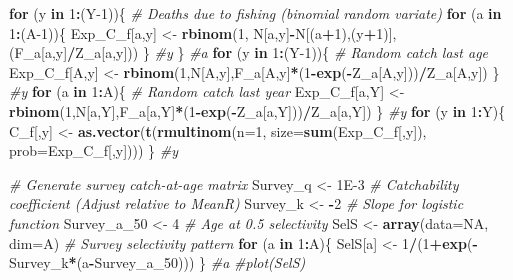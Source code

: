 \documentclass[
]{krantz}
\makeatletter
\newenvironment{Shaded}{\begin{snugshade}}{\end{snugshade}}
\newcommand{\AttributeTok}[1]{\textcolor[rgb]{0.27,0.27,0.27}{#1}}
\newcommand{\CommentTok}[1]{\textcolor[rgb]{0.37,0.37,0.37}{\textit{#1}}}
\newcommand{\ConstantTok}[1]{\textcolor[rgb]{0.37,0.37,0.37}{#1}}
\newcommand{\ControlFlowTok}[1]{\textcolor[rgb]{0.27,0.27,0.27}{\textbf{#1}}}
\newcommand{\DecValTok}[1]{\textcolor[rgb]{0.06,0.06,0.06}{#1}}
\newcommand{\FloatTok}[1]{\textcolor[rgb]{0.06,0.06,0.06}{#1}}
\newcommand{\FunctionTok}[1]{\textcolor[rgb]{0.27,0.27,0.27}{\textbf{#1}}}
\newcommand{\NormalTok}[1]{#1}
\newcommand{\OtherTok}[1]{\textcolor[rgb]{0.37,0.37,0.37}{#1}}
\newcommand{\SpecialCharTok}[1]{\textcolor[rgb]{0.43,0.43,0.43}{\textbf{#1}}}
\newenvironment{kframe}{%
\medskip{}
\setlength{\fboxsep}{.8em}
 \def\at@end@of@kframe{}%
 \ifinner\ifhmode%
  \def\at@end@of@kframe{\end{minipage}}%
  \begin{minipage}{\columnwidth}%
 \fi\fi%
 \def\FrameCommand##1{\hskip\@totalleftmargin \hskip-\fboxsep
 \colorbox{shadecolor}{##1}\hskip-\fboxsep
     \hskip-\linewidth \hskip-\@totalleftmargin \hskip\columnwidth}%
 \MakeFramed {\advance\hsize-\width
   \@totalleftmargin\z@ \linewidth\hsize
   \@setminipage}}%
 {\par\unskip\endMakeFramed%
 \at@end@of@kframe}
\renewenvironment{Shaded}{\begin{kframe}}{\end{kframe}}
\makeatother
\begin{document}
\begin{Shaded}
\begin{Highlighting}[]
\ControlFlowTok{for}\NormalTok{ (y }\ControlFlowTok{in} \DecValTok{1}\SpecialCharTok{:}\NormalTok{(Y}\DecValTok{{-}1}\NormalTok{))\{ }\CommentTok{\# Deaths due to fishing (binomial random variate)}
  \ControlFlowTok{for}\NormalTok{ (a }\ControlFlowTok{in} \DecValTok{1}\SpecialCharTok{:}\NormalTok{(A}\DecValTok{{-}1}\NormalTok{))\{}
\NormalTok{    Exp\_C\_f[a,y] }\OtherTok{\textless{}{-}} \FunctionTok{rbinom}\NormalTok{(}\DecValTok{1}\NormalTok{, N[a,y]}\SpecialCharTok{{-}}\NormalTok{N[(a}\SpecialCharTok{+}\DecValTok{1}\NormalTok{),(y}\SpecialCharTok{+}\DecValTok{1}\NormalTok{)],(F\_a[a,y]}\SpecialCharTok{/}\NormalTok{Z\_a[a,y]))}
\NormalTok{  \} }\CommentTok{\#y}
\NormalTok{\} }\CommentTok{\#a}
\ControlFlowTok{for}\NormalTok{ (y }\ControlFlowTok{in} \DecValTok{1}\SpecialCharTok{:}\NormalTok{(Y}\DecValTok{{-}1}\NormalTok{))\{ }\CommentTok{\# Random catch last age}
\NormalTok{  Exp\_C\_f[A,y] }\OtherTok{\textless{}{-}} \FunctionTok{rbinom}\NormalTok{(}\DecValTok{1}\NormalTok{,N[A,y],F\_a[A,y]}\SpecialCharTok{*}\NormalTok{(}\DecValTok{1}\SpecialCharTok{{-}}\FunctionTok{exp}\NormalTok{(}\SpecialCharTok{{-}}\NormalTok{Z\_a[A,y]))}\SpecialCharTok{/}\NormalTok{Z\_a[A,y])}
\NormalTok{\} }\CommentTok{\#y}
\ControlFlowTok{for}\NormalTok{ (a }\ControlFlowTok{in} \DecValTok{1}\SpecialCharTok{:}\NormalTok{A)\{ }\CommentTok{\# Random catch last year}
\NormalTok{  Exp\_C\_f[a,Y] }\OtherTok{\textless{}{-}} \FunctionTok{rbinom}\NormalTok{(}\DecValTok{1}\NormalTok{,N[a,Y],F\_a[a,Y]}\SpecialCharTok{*}\NormalTok{(}\DecValTok{1}\SpecialCharTok{{-}}\FunctionTok{exp}\NormalTok{(}\SpecialCharTok{{-}}\NormalTok{Z\_a[a,Y]))}\SpecialCharTok{/}\NormalTok{Z\_a[a,Y])}
\NormalTok{\} }\CommentTok{\#y}
\ControlFlowTok{for}\NormalTok{ (y }\ControlFlowTok{in} \DecValTok{1}\SpecialCharTok{:}\NormalTok{Y)\{}
\NormalTok{  C\_f[,y] }\OtherTok{\textless{}{-}} \FunctionTok{as.vector}\NormalTok{(}\FunctionTok{t}\NormalTok{(}\FunctionTok{rmultinom}\NormalTok{(}\AttributeTok{n=}\DecValTok{1}\NormalTok{, }\AttributeTok{size=}\FunctionTok{sum}\NormalTok{(Exp\_C\_f[,y]), }
                                   \AttributeTok{prob=}\NormalTok{Exp\_C\_f[,y])))}
\NormalTok{\} }\CommentTok{\#y}

\CommentTok{\# Generate survey catch{-}at{-}age matrix}
\NormalTok{Survey\_q }\OtherTok{\textless{}{-}} \FloatTok{1E{-}3} \CommentTok{\# Catchability coefficient (Adjust relative to MeanR)}
\NormalTok{Survey\_k }\OtherTok{\textless{}{-}} \SpecialCharTok{{-}}\DecValTok{2} \CommentTok{\# Slope for logistic function}
\NormalTok{Survey\_a\_50 }\OtherTok{\textless{}{-}} \DecValTok{4} \CommentTok{\# Age at 0.5 selectivity}
\NormalTok{SelS }\OtherTok{\textless{}{-}} \FunctionTok{array}\NormalTok{(}\AttributeTok{data=}\ConstantTok{NA}\NormalTok{, }\AttributeTok{dim=}\NormalTok{A) }\CommentTok{\# Survey selectivity pattern}
\ControlFlowTok{for}\NormalTok{ (a }\ControlFlowTok{in} \DecValTok{1}\SpecialCharTok{:}\NormalTok{A)\{}
\NormalTok{  SelS[a] }\OtherTok{\textless{}{-}} \DecValTok{1}\SpecialCharTok{/}\NormalTok{(}\DecValTok{1}\SpecialCharTok{+}\FunctionTok{exp}\NormalTok{(}\SpecialCharTok{{-}}\NormalTok{Survey\_k}\SpecialCharTok{*}\NormalTok{(a}\SpecialCharTok{{-}}\NormalTok{Survey\_a\_50)))}
\NormalTok{\} }\CommentTok{\#a}
\CommentTok{\#plot(SelS)}


\end{Highlighting}
\end{Shaded}
\end{document}
